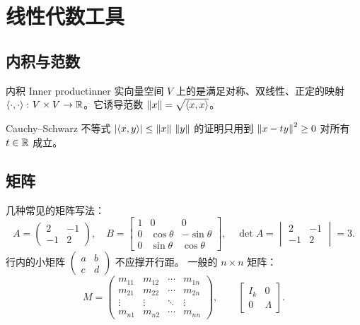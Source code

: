 \chapter{线性代数工具}\label{chap:linalg}

\section{内积与范数}\label{sec:inner}

\begin{definition}{内积 Inner product}{inner}
  实向量空间 $V$ 上的是满足对称、双线性、正定的映射
  $\left\langle \cdot, \cdot \right\rangle\colon V \times V \to \mathbb{R}$。它诱导范数 $\left\lVert x \right\rVert = \sqrt{\left\langle x, x \right\rangle}$。
\end{definition}

Cauchy--Schwarz 不等式 $\left\lvert \left\langle x, y \right\rangle \right\rvert \le \left\lVert x \right\rVert\,\left\lVert y \right\rVert$ 的证明只用到
$\left\lVert x - t y \right\rVert^2 \ge 0$ 对所有 $t \in \mathbb{R}$ 成立。

\section{矩阵}\label{sec:matrices}

几种常见的矩阵写法：
\begin{equation}\label{eq:matrices}
  A = \begin{pmatrix} 2 & -1 \\ -1 & 2 \end{pmatrix}, \quad
  B = \begin{bmatrix} 1 & 0 & 0 \\ 0 & \cos\theta & -\sin\theta \\ 0 & \sin\theta & \cos\theta \end{bmatrix}, \quad
  \det A = \begin{vmatrix} 2 & -1 \\ -1 & 2 \end{vmatrix} = 3.
\end{equation}
行内的小矩阵 $\left(\begin{smallmatrix} a & b \\ c & d \end{smallmatrix}\right)$ 不应撑开行距。
一般的 $n \times n$ 矩阵：
\[
  M = \begin{pmatrix}
    m_{11} & m_{12} & \cdots & m_{1n} \\
    m_{21} & m_{22} & \cdots & m_{2n} \\
    \vdots & \vdots & \ddots & \vdots \\
    m_{n1} & m_{n2} & \cdots & m_{nn}
  \end{pmatrix}, \qquad
  \left[\begin{array}{c|c}
    I_k & 0 \\ \hline
    0 & \Lambda
  \end{array}\right].
\]

